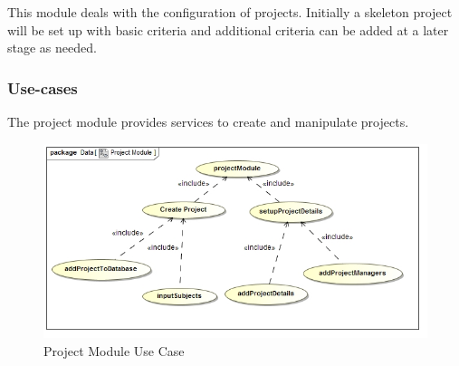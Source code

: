 This module deals with the configuration of projects. Initially a skeleton project will be set up with basic criteria 
and additional criteria can be added at a later stage as needed.
\subsubsection{Use-cases}
The project module provides services to create and manipulate projects.\par
\begin{figure}[H]
    \centering
    \includegraphics[width=15cm]{./graphics/projectModuleUseCase.jpg}
    \caption{Project Module Use Case}
\end{figure}
    
